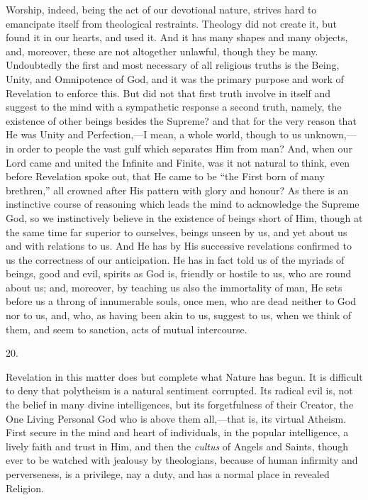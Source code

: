 Worship, indeed, being the act of our devotional nature, strives
hard to emancipate itself from theological restraints. Theology did
not create it, but found it in our hearts, and used it. And it has
many shapes and many objects, and, moreover, these are not altogether
unlawful, though they be many. Undoubtedly the first and most
necessary of all religious truths is the Being, Unity, and Omnipotence
of God, and it was the primary purpose and work of Revelation to
enforce this. But did not that first truth involve in itself and
suggest to the mind with a sympathetic response a second truth,
namely, the existence of other beings besides the Supreme? and that
for the very reason that He was Unity and Perfection,—I mean, a
whole world, though to us unknown,—in order to people the vast gulf
which separates Him from man? And, when our Lord came and united the
Infinite and Finite, was it not natural to think, even before
Revelation spoke out, that He came to be ``the First born of many
brethren,'' all crowned after His pattern with glory and honour?
As there is an instinctive course of reasoning which leads the mind to
acknowledge the Supreme God, so we instinctively believe in the
existence of beings short of Him, though at the same time far superior
to ourselves, beings unseen by us, and yet about us and with relations
to us. And He has by His successive revelations confirmed to us the
correctness of our anticipation. He has in fact told us of the myriads
of beings, good and evil, spirits as God is, friendly or hostile to
us, who are round about us; and, moreover, by teaching us also the
immortality of man, He sets before us a throng of innumerable souls,
once men, who are dead neither to God nor to us, and, who, as having
been akin to us, suggest to us, when we think of them, and seem to
sanction, acts of mutual intercourse.

20.

Revelation in this matter does but complete what Nature has begun.
It is difficult to deny that polytheism is a natural sentiment
corrupted. Its radical evil is, not the belief in many divine
intelligences, but its forgetfulness of their Creator, the One Living
Personal God who is above them all,—that is, its virtual Atheism.
First secure in the mind and heart of individuals, in the popular
intelligence, a lively faith and trust in Him, and then the \emph{cultus}
of Angels and Saints, though ever to be watched with jealousy by
theologians, because of human infirmity and perverseness, is a
privilege, nay a duty, and has a normal place in revealed Religion.

